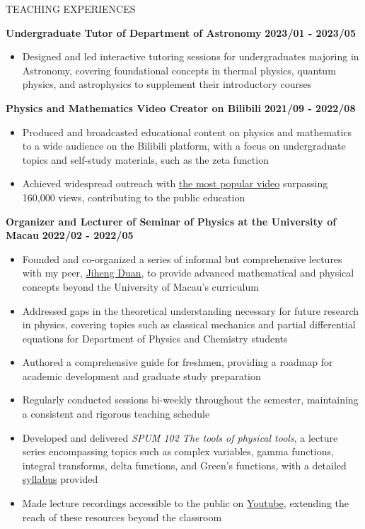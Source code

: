 \documentclass[10pt]{article} %
\begin{document}
\begin{section}{TEACHING EXPERIENCES}

\textbf{Undergraduate Tutor of Department of Astronomy} \hfill \textbf{2023/01 - 2023/05}
\begin{itemize}[leftmargin=1.5em]
    \item Designed and led interactive tutoring sessions for undergraduates majoring in Astronomy, covering foundational concepts in thermal physics, quantum physics, and astrophysics to supplement their introductory courses
\end{itemize}

\textbf{Physics and Mathematics Video Creator on Bilibili} \hfill \textbf{2021/09 - 2022/08}
\begin{itemize}[leftmargin=1.5em]
    \item Produced and broadcasted  educational content on physics and mathematics to a wide audience on the Bilibili platform, with a focus on undergraduate topics and self-study materials, such as the zeta function
    \item Achieved widespread outreach with \href{https://www.bilibili.com/video/BV1th411W7xu/}{the most popular video} surpassing 160,000 views, contributing to the public education
\end{itemize}

\textbf{Organizer and Lecturer of Seminar of Physics at the University of Macau} \hfill \textbf{2022/02 - 2022/05}
\begin{itemize}[leftmargin=1.5em]
    \item Founded and co-organized a series of informal but comprehensive lectures with my peer, \href{http://runawayfancy.me/}{Jiheng Duan}, to provide advanced mathematical and physical concepts beyond the University of Macau's curriculum
    \item Addressed gaps in the theoretical understanding necessary for future research in physics, covering topics such as classical mechanics and partial differential equations for Department of Physics and Chemistry students
    \item Authored a comprehensive guide for freshmen, providing a roadmap for academic development and graduate study preparation
    \item Regularly conducted sessions bi-weekly throughout the semester, maintaining a consistent and rigorous teaching schedule
    \item Developed and delivered \textit{SPUM 102 The tools of physical tools}, a lecture series encompassing topics such as complex variables, gamma functions, integral transforms, delta functions, and Green's functions, with a detailed \href{https://github.com/Chisen-Lupus/Seminar-of-Physics-UM/blob/main/SPUM%20102%20The%20tools%20of%20physical%20tool.pdf}{syllabus} provided
    \item Made lecture recordings accessible to the public on \href{https://www.youtube.com/watch?v=nQkv03r-XeQ&list=PLV9fHDZW7hHWQ9rrAk7c9kdeV-Lqyt7pV&index=10}{Youtube}, extending the reach of these resources beyond the classroom
\end{itemize}

\end{section}
\end{document}
